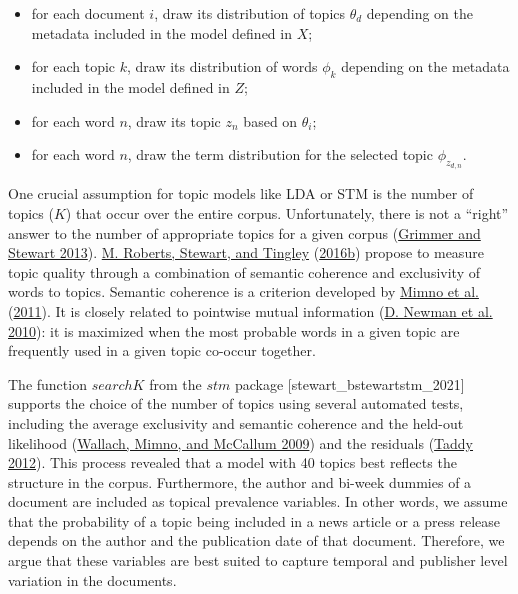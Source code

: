 \documentclass[
  12pt,
]{article}
\providecommand{\tightlist}{%
  \setlength{\itemsep}{0pt}\setlength{\parskip}{0pt}}
\begin{document}
\begin{itemize}
\tightlist
\item
  for each document \(i\), draw its distribution of topics \(\theta_d\)
  depending on the metadata included in the model defined in \(X\);
\item
  for each topic \(k\), draw its distribution of words \(\phi_k\)
  depending on the metadata included in the model defined in \(Z\);
\item
  for each word \(n\), draw its topic \(z_n\) based on \(\theta_i\);
\item
  for each word \(n\), draw the term distribution for the selected topic
  \(\phi_{z_{d,n}}\).
\end{itemize}

One crucial assumption for topic models like LDA or STM is the number of
topics (\(K\)) that occur over the entire corpus. Unfortunately, there
is not a ``right'' answer to the number of appropriate topics for a
given corpus (\protect\hyperlink{ref-grimmer_text_2013}{Grimmer and
Stewart 2013}). \protect\hyperlink{ref-roberts_stm:_2016}{M. Roberts,
Stewart, and Tingley} (\protect\hyperlink{ref-roberts_stm:_2016}{2016b})
propose to measure topic quality through a combination of semantic
coherence and exclusivity of words to topics. Semantic coherence is a
criterion developed by
\protect\hyperlink{ref-mimno_optimizing_2011}{Mimno et al.}
(\protect\hyperlink{ref-mimno_optimizing_2011}{2011}). It is closely
related to pointwise mutual information
(\protect\hyperlink{ref-newman_automatic_2010}{D. Newman et al. 2010}):
it is maximized when the most probable words in a given topic are
frequently used in a given topic co-occur together.

The function \(searchK\) from the \(stm\) package
{[}stewart\_bstewartstm\_2021{]} supports the choice of the number of
topics using several automated tests, including the average exclusivity
and semantic coherence and the held-out likelihood
(\protect\hyperlink{ref-wallach_rethinking_2009}{Wallach, Mimno, and
McCallum 2009}) and the residuals
(\protect\hyperlink{ref-taddy_estimation_2012}{Taddy 2012}). This
process revealed that a model with 40 topics best reflects the structure
in the corpus. Furthermore, the author and bi-week dummies of a document
are included as topical prevalence variables. In other words, we assume
that the probability of a topic being included in a news article or a
press release depends on the author and the publication date of that
document. Therefore, we argue that these variables are best suited to
capture temporal and publisher level variation in the documents.
\end{document}
